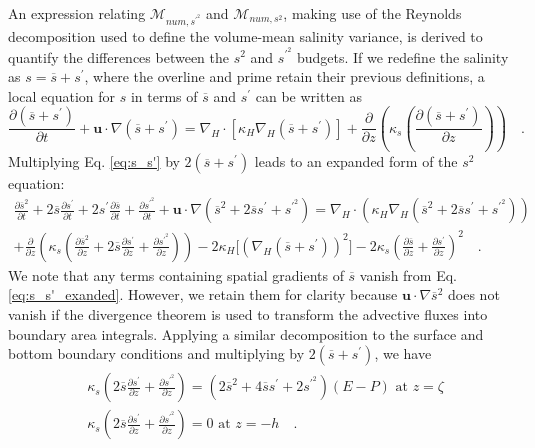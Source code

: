 An expression relating $\mathcal{M}_{num, s^{\prime^2}}$ and $\mathcal{M}_{num, s^2}$, making use of the Reynolds decomposition used to define the volume-mean salinity variance, is derived to quantify the differences between the $s^2$ and $s^{\prime^2}$ budgets. If we redefine the salinity as $s = \overline{s}+s^\prime$, where the overline and prime retain their previous definitions, a local equation for $s$ in terms of $\overline{s}$ and $s^\prime$ can be written as
\begin{equation} \label{eq:s_s'}
    \frac{\partial \left(\overline{s}+ s^\prime \right)}{\partial t}+ \textbf{u} \cdot \nabla \left(\overline{s}+ s^\prime \right) = \nabla_H \cdot \left[\kappa_H \nabla_H \left(\overline{s}+s^\prime \right) \right]+ \frac{\partial}{\partial z} \left(\kappa_s \left(\frac{\partial (\overline{s}+ s^\prime)}{\partial z} \right) \right) \quad .
\end{equation}
Multiplying Eq. \ref{eq:s_s'} by $2(\overline{s}+s^\prime)$ leads to an expanded form of the $s^2$ equation:
\begin{equation} \label{eq:s_s'_exanded}
    \begin{split}
        \frac{\partial \overline{s}^2}{\partial t} + 2\overline{s} \frac{\partial s^\prime}{\partial t} +2s^\prime \frac{\partial \overline{s}}{\partial t} + \frac{\partial s^{\prime^2}}{\partial t}+
        \textbf{u} \cdot \nabla \left(\overline{s}^2+2 \overline{s} s^\prime+s^{\prime^2} \right) = \nabla_H \cdot \left(\kappa_H \nabla_H \left(\overline{s}^2+2\overline{s}s^{\prime}+s^{\prime^2} \right) \right) \\
        + \frac{\partial}{\partial z} \left(\kappa_s \left(\frac{\partial \overline{s}^2}{\partial z} + 2\overline{s} \frac{\partial s^\prime}{\partial z} + \frac{\partial s^{\prime^2}}{\partial z} \right) \right) -2\kappa_H \big[(\nabla_H (\overline{s}+s^\prime))^2 \big]-2 \kappa_s \left(\frac{\partial \overline{s}}{\partial z} + \frac{\partial s^\prime}{\partial z} \right)^{2} \quad .
    \end{split}
\end{equation}
We note that any terms containing spatial gradients of $\overline{s}$ vanish from Eq. \ref{eq:s_s'_exanded}. However, we retain them for clarity because $\mathbf{u} \cdot \nabla \overline{s}^2$ does not vanish if the divergence theorem is used to transform the advective fluxes into boundary area integrals. Applying a similar decomposition to the surface and bottom boundary conditions and multiplying by $2(\overline{s}+s^\prime)$,  we have
\begin{align} \label{eq:salt_bcs_sprime_expanded}
\begin{split}
    &  \kappa_s \left(2\overline{s} \frac{\partial s^\prime}{\partial z}+\frac{\partial s^{\prime^2}}{\partial z}\right) = \left(2\overline{s}^2+4 \overline{s} s^\prime+2s^{\prime^2} \right)(E-P) \,\, \textrm{at} \,\, z = \zeta \\
    &  \kappa_s \left(2\overline{s} \frac{\partial s^\prime}{\partial z} +\frac{\partial s^{\prime^2}}{\partial z}\right) = 0 \,\, \textrm{at} \,\, z = -h \quad . \\
\end{split}
\end{align}

